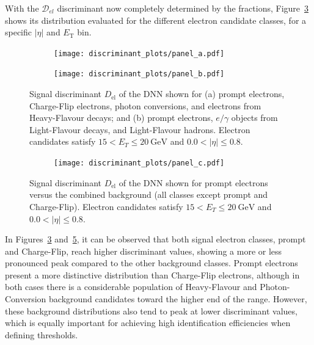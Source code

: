 With the $ \mathcal{D}_{el} $ discriminant now completely determined by the fractions, Figure~\ref{fig:dnn_final_disc_ab} shows its distribution evaluated for the different electron candidate classes, for a specific $|\eta|$ and $E_{\text{T}}$ bin.
\begin{figure}[htbp]
  \centering
  \begin{subfigure}[t]{0.48\linewidth}
    \centering
    \texttt{[image: discriminant\_plots/panel\_a.pdf]}
    \caption{}
    \label{fig:dnnDisc_a}
  \end{subfigure}\hfill
  \begin{subfigure}[t]{0.48\linewidth}
    \centering
    \texttt{[image: discriminant\_plots/panel\_b.pdf]}
    \caption{}
    \label{fig:dnnDisc_b}
  \end{subfigure}

  \caption{Signal discriminant $D_{\mathrm{el}}$ of the DNN shown for (a) prompt electrons,
  Charge-Flip electrons, photon conversions, and electrons from Heavy-Flavour decays; and
  (b) prompt electrons, $e/\gamma$ objects from Light-Flavour decays, and Light-Flavour hadrons.
  Electron candidates satisfy $15<E_{T}\leq 20~\mathrm{GeV}$ and $0.0<|\eta|\leq 0.8$.}
  \label{fig:dnn_final_disc_ab}
\end{figure}

\begin{figure}[htbp]
  \centering
  \begin{subfigure}[t]{0.60\linewidth}
    \centering
    \texttt{[image: discriminant\_plots/panel\_c.pdf]}
    \label{fig:dnnDisc_c}
  \end{subfigure}

  \caption{Signal discriminant $D_{\mathrm{el}}$ of the DNN shown for prompt electrons versus
  the combined background (all classes except prompt and Charge-Flip).
  Electron candidates satisfy $15<E_{T}\leq 20~\mathrm{GeV}$ and $0.0<|\eta|\leq 0.8$.}
  \label{fig:dnn_final_disc_c}
\end{figure}



In Figures~\ref{fig:dnn_final_disc_ab} and~\ref{fig:dnn_final_disc_c}, it can be observed that both signal electron classes, prompt and Charge-Flip, reach higher discriminant values, showing a more or less pronounced peak compared to the other background classes. Prompt electrons present a more distinctive distribution than Charge-Flip electrons, although in both cases there is a considerable population of Heavy-Flavour and Photon-Conversion background candidates toward the higher end of the range. However, these background distributions also tend to peak at lower discriminant values, which is equally important for achieving high identification efficiencies when defining thresholds.

